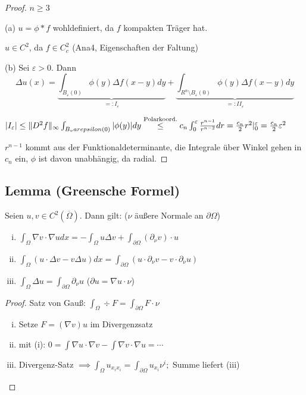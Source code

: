 \begin{proof}
  $n \geq 3$

  (a) $u = \phi \ast f$ wohldefiniert, da $f$ kompakten Träger hat.

  $u \in C^2$, da $f \in C_c^2$ (Ana4, Eigenschaften der Faltung)

  (b) Sei $\varepsilon > 0$. Dann 
  $$
  \Delta u(x) = \underbrace{\int_{B_\varepsilon(0)} \phi(y) \Delta f(x - y) dy}_{=: I_\varepsilon} + \underbrace{\int_{R^n \setminus B_\varepsilon(0)} \phi(y) \Delta f(x - y) dy}_{=: II_\varepsilon}
  $$

  $|I_\varepsilon| \leq \lVert D^2 f \rVert_\infty \int_{B_varepsilon(0)} |\phi(y)| dy \overset{\text{Polarkoord.}}{\leq} c_n \int_0^\varepsilon \frac{r^{n - 1}}{r^{n - 2}} dr = \frac{c_n}{2} r^2 |_0^\varepsilon = \frac{c_n}{2} \varepsilon^2$

  {\tiny{$r^{n-1}$ kommt aus der Funktionaldeterminante, die Integrale über Winkel gehen in $c_n$ ein, $\phi$ ist davon unabhängig, da radial.}}
\end{proof}

\subsection{Lemma (Greensche Formel)}

Seien $u,v \in C^2(\overline \Omega)$.
Dann gilt: ($\nu$ äußere Normale an $\partial \Omega$)
\begin{enumerate}[(i)]
  \item $\int_\Omega \nabla v \cdot \nabla u dx = - \int_\Omega u \Delta v + \int_{\partial\Omega} (\partial_\nu v) \cdot u$
  \item $\int_\Omega (u \cdot \Delta v - v \Delta u) dx = \int_{\partial \Omega} (u \cdot \partial_\nu v - v \cdot \partial_\nu u)$
  \item $\int_\Omega \Delta u = \int_{\partial \Omega} \partial_\nu u$ ($\partial u = \nabla u \cdot \nu$)
\end{enumerate}

\begin{proof}
  Satz von Gauß: $\int_\Omega \div F = \int_{\partial \Omega} F \cdot \nu$

  \begin{enumerate}[(i)]
    \item Setze $F = (\nabla v) u$ im Divergenzsatz
    \item mit (i): $0 = \int\nabla u \cdot \nabla v - \int \nabla v \cdot \nabla u = \cdots$
    \item Divergenz-Satz $\implies \int_\Omega u_{x_i x_i} = \int_{\partial \Omega} u_{x_i} \nu^i; $ Summe liefert (iii)
  \end{enumerate}
\end{proof}

